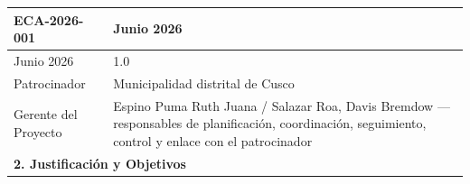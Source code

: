 \begin{table}[h]
{\begin{tabularx}{27cm}{|X|X|}
			\multicolumn{1}{|l|}{ECA-2026-001}                    & Junio 2026                                                                                                                                                                                                                                                                                                                                                                                                                                                \\ \hline
			\multicolumn{1}{|l|}{Junio 2026}                      & 1.0                                                                                                                                                                                                                                                                                                                                                                                                                                                       \\ \hline
			\multicolumn{1}{|l|}{Patrocinador}                    & Municipalidad distrital de Cusco                                                                                                                                                                                                                                                                                                                          \\ \hline
			\multicolumn{1}{|l|}{Gerente del Proyecto}            & Espino Puma Ruth Juana / Salazar Roa, Davis Bremdow — responsables de planificación, coordinación, seguimiento, control y enlace con el patrocinador                                                                                                                                                                                                                                                                                                                          \\ \hline
			\multicolumn{2}{|l|}{\textbf{2. Justificación y Objetivos}}                                                                                                                                                                                                                                                                                                                                                                                                                                                       \\ \hline

\end{tabularx}}
\end{table}
